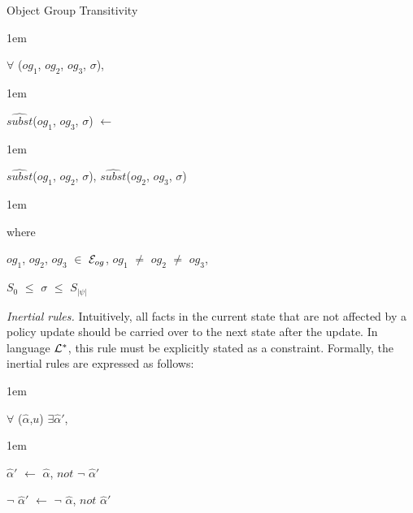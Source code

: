 \documentclass[global,twocolumn,final]{svjour}
\newenvironment{vquote}
  {\begin{list}{}{\leftmargin 1em}\item[]}
  {\end{list}}
\begin{document}
\begin{itemize}
\begin{enumerate}
                \item
                  Object Group Transitivity

                  \begin{vquote}
                    $\forall$ ($og_{1}$, $og_{2}$, $og_{3}$, $\sigma$),
                  \end{vquote}

                  \begin{vquote}
                    $\hat{subst}$($og_{1}$, $og_{3}$, $\sigma$) $\leftarrow$
                  \end{vquote}

                  \begin{vquote}
                    \hspace{1em}
                    $\hat{subst}$($og_{1}$, $og_{2}$, $\sigma$),
                    $\hat{subst}$($og_{2}$, $og_{3}$, $\sigma$)
                  \end{vquote}

                  \begin{vquote}
                    where

                    $og_{1}$, $og_{2}$, $og_{3}$ $\in$ ${\cal E}_{og}$,
                    $og_{1}$ $\neq$ $og_{2}$ $\neq$ $og_{3}$,

                    $S_{0}$ $\leq$ $\sigma$ $\leq$ $S_{|\psi|}$
                  \end{vquote}
               \end{enumerate}

            \item
              {\em Inertial rules.}
              Intuitively, all facts in the current state that are not affected
              by a policy update should be carried over to the next state after
              the update. In language ${\cal L}^{*}$, this rule must be
              explicitly stated as a constraint. Formally, the inertial rules
              are expressed as follows:

              \begin{vquote}
                $\forall$ ($\hat{\alpha}$,$u$) $\exists$$\hat{\alpha}'$,
              \end{vquote}

              \begin{vquote}
                $\hat{\alpha}'$ $\leftarrow$ $\hat{\alpha}$, $not$ $\lnot$ $\hat{\alpha}'$

                $\lnot$ $\hat{\alpha}'$ $\leftarrow$ $\lnot$ $\hat{\alpha}$, $not$ $\hat{\alpha}'$
              \end{vquote}


\end{itemize}
\end{document}

